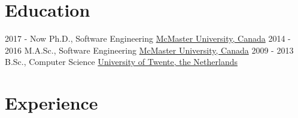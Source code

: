 \documentclass[letterpaper]{twentysecondcv} %
\begin{document}
\makeprofile %



\section{Education}

\begin{twenty} %
  \twentyitem
    {2017 - Now}
    {}
    {Ph.D., Software Engineering}%
    {\href{https://www.mcmaster.ca/}{McMaster University, Canada}}
    {}
    {}
  \twentyitem
    {2014 - 2016}
    {}
    {M.A.Sc., Software Engineering}%
    {\href{https://www.mcmaster.ca/}{McMaster University, Canada}}
    {}
    {}
  \twentyitem
    {2009 - 2013}
    {}
    {B.Sc., Computer Science}%
    {\href{https://www.utwente.nl/}{University of Twente, the Netherlands}}
    {}
    {}
\end{twenty}
\vspace{-1em}
\vspace{-.5em}


\section{Experience}
\end{document}
